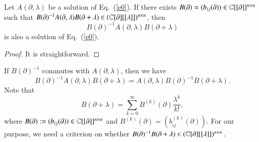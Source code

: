 \documentclass[12pt]{amsart}
\begin{document}
\begin{lem}\label{lem-1}
Let $A(\partial, \lambda)$ be a solution of Eq.~(\ref{e0}). If there exists $B(\partial)=(b_{ij}(\partial))\in \mathbb{C}[[\partial]]^{n\times n}$ such that $B(\partial)^{-1}A(\partial,\lambda)B(\partial+\lambda)\in(\mathbb{C}[\partial][[\lambda]])^{n\times n}$, then
$$B(\partial)^{-1}A(\partial,\lambda)B(\partial+\lambda)$$
is also a solution of Eq.~(\ref{e0}). 
\end{lem}
\begin{proof}
It is straightforward.
\end{proof}
If $B(\partial)^{-1}$ commutes with $A(\partial,\lambda)$, then we have
$$B(\partial)^{-1}A(\partial,\lambda)B(\partial+\lambda)=A(\partial,\lambda)B(\partial)^{-1}B(\partial+\lambda).$$
Note that $$B(\partial+\lambda)=\sum_{k=0}^\infty B^{(k)}(\partial)\frac{\lambda^k}{k!},$$ where
$B(\partial):=(b_{ij}(\partial))\in \mathbb{C}[[\partial]]^{n\times n}$ and $B^{(k)}(\partial)=(b_{ij}^{(k)}(\partial))$.
For our purpose, we need a criterion on whether $B(\partial)^{-1}B(\partial+\lambda)\in(\mathbb{C}[\partial][[\lambda]])^{n\times n}$.
\end{document}
